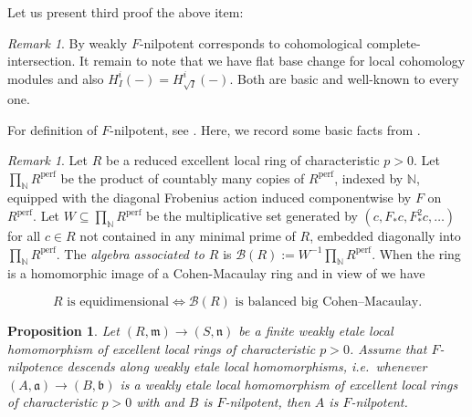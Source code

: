 \documentclass[10pt,a4paper]{amsart}
\newtheorem{proposition}[theorem]{Proposition}
\theoremstyle{definition}
\theoremstyle{remark}
\newtheorem{remark}[theorem]{Remark}
\begin{document}
Let us present third proof the above item: \begin{remark}By \cite[Corollary 5.9]{A} weakly \(F\)-nilpotent corresponds to cohomological complete-intersection. It remain to note that
we have flat base change for local cohomology modules and also $H^i_{I}(-)=H^i_{\sqrt{I}}(-)$. Both are basic and well-known to every one.\end{remark}
 
For definition of \(F\)-nilpotent, see \cite[\S 12]{MP}.
Here, we record some basic facts from \cite{MP}.

\begin{remark} Let \(R\) be a reduced excellent local ring of characteristic \(p>0\). Let
	\(
	\prod_{\mathbb N}R^{\mathrm{perf}}
	\)
	be the product of countably many copies of \(R^{\mathrm{perf}}\), indexed by
	\(\mathbb N\), equipped with the diagonal Frobenius action induced componentwise
	by \(F\) on \(R^{\mathrm{perf}}\). Let
	\(
	W\subseteq \prod_{\mathbb N}R^{\mathrm{perf}}
	\)
	be the multiplicative set generated by
	\(
	(c,F_*c,F_*^2c,\dots)
	\)
	for all \(c\in R\) not contained in any minimal prime of \(R\), embedded
	diagonally into \(\prod_{\mathbb N}R^{\mathrm{perf}}\). The
	\emph{ algebra associated to \(R\)} is
	\( 
	\mathcal B(R)
	:=
	W^{-1}\prod_{\mathbb N}R^{\mathrm{perf}}.
	\)
When the ring is a homomorphic image of a Cohen-Macaulay ring
and in view of \cite[Theorem 12.15]{MP} we have

	\[
R \text{ is equidimensional} \Longleftrightarrow \mathcal B(R)\text{  is balanced big Cohen--Macaulay.}
\]
\end{remark}






\begin{proposition} 
	\label{thm:Fnilpotent-descent}
	Let \((R,\mathfrak m)\to(S,\mathfrak n)\) be a finite weakly etale local homomorphism of
	excellent local rings of characteristic \(p>0\).
	Assume that \(F\)-nilpotence descends along weakly etale local homomorphisms,
	i.e.\ whenever \((A,\mathfrak a)\to(B,\mathfrak b)\) is a weakly etale local
	homomorphism of excellent local rings of characteristic \(p>0\) with
 and \(B\) is \(F\)-nilpotent, then \(A\) is
	\(F\)-nilpotent.
\end{proposition}
\end{document}

